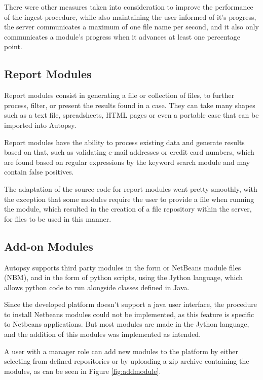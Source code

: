 There were other measures taken into consideration to improve the performance of the ingest procedure, while also maintaining the user informed of it's progress, the server communicates a maximum of one file name per
second, and it also only communicates a module's progress when it advances at least one percentage point.

\subsection{Report Modules}

Report modules consist in generating a file or collection of files, to further process, filter, or present the results found in a case. They can take many shapes such as a text file, spreadsheets, HTML pages or even a portable case that can be imported into Autopsy.

Report modules have the ability to process existing data and generate results based on that, such as validating e-mail addresses or credit card numbers, 
which are found based on regular expressions by the keyword search module and may contain false positives.

The adaptation of the source code for report modules went pretty smoothly, with the exception that some modules require the user to provide a file when running the module, which resulted in the creation of a file repository within the server, for files to be used in this manner.

\subsection{Add-on Modules}

Autopsy supports third party modules in the form or NetBeans \cite{netbeans} module files (NBM), and in the form of python scripts, using the Jython language, which allows python code to run alongside classes defined in Java.

Since the developed platform doesn't support a java user interface, the procedure to install Netbeans modules could not be implemented, as this feature is specific to Netbeans applications. 
But most modules are made in the Jython language, and the addition of this modules was implemented as intended.

A user with a manager role can add new modules to the platform by either selecting from defined repositories or by uploading a zip archive containing the modules, as can be seen in Figure \ref{fig:addmodule}.

